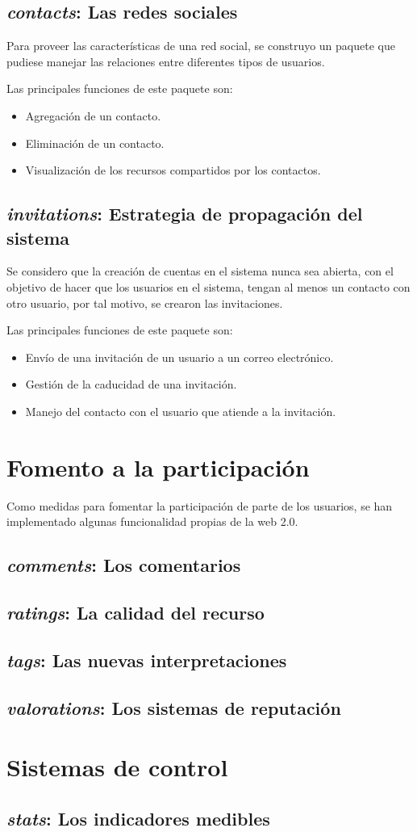 \subsection{\emph{contacts}: Las redes sociales}
Para proveer las características de una red social, se construyo un paquete que
pudiese manejar las relaciones entre diferentes tipos de usuarios.

Las principales funciones de este paquete son:

\begin{itemize}
\item Agregación de un contacto.
\item Eliminación de un contacto.
\item Visualización de los recursos compartidos por los contactos.
\end{itemize}

\subsection{\emph{invitations}: Estrategia de propagación del sistema}
Se considero que la creación de cuentas en el sistema nunca sea abierta, con el
objetivo de hacer que los usuarios en el sistema, tengan al menos un contacto
con otro usuario, por tal motivo, se crearon las invitaciones.

Las principales funciones de este paquete son:

\begin{itemize}
\item Envío de una invitación de un usuario a un correo electrónico.
\item Gestión de la caducidad de una invitación.
\item Manejo del contacto con el usuario que atiende a la invitación.
\end{itemize}

\section{Fomento a la participación}
Como medidas para fomentar la participación de parte de los usuarios, se han
implementado algunas funcionalidad propias de la web 2.0.

\subsection{\emph{comments}: Los comentarios}
\subsection{\emph{ratings}: La calidad del recurso}
\subsection{\emph{tags}: Las nuevas interpretaciones}
\subsection{\emph{valorations}: Los sistemas de reputación}

\section{Sistemas de control}
\subsection{\emph{stats}: Los indicadores medibles}

